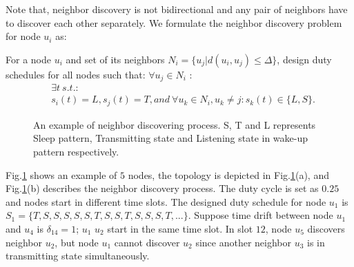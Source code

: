 Note that, neighbor discovery is not bidirectional and any pair of neighbors have to discover each other separately.
We formulate the neighbor discovery problem for node $u_i$ as:
\begin{problem}
For a node $u_i$ and set of its neighbors $N_i = \{u_j | d(u_i, u_j)\leq \Delta \}$, design duty schedules for all nodes such that:
$\forall u_j \in N_i$ :
$$
\begin{aligned}
&\exists t \ s.t. :   \\%
&s_i(t) = L ,
s_{j}(t) = T, and~
\forall u_k \in N_i, u_k \neq j : s_{k}(t) \in \{L, S\}.
\end{aligned}
$$
\end{problem}

\begin{figure}[!h]
\centering
{}
\vspace{0.03in}
\caption{An example of neighbor discovering process. S, T and L represents Sleep pattern,
Transmitting state and Listening state in wake-up pattern respectively.}
\label{NDexample}
\end{figure}

Fig.\ref{NDexample} shows an example of $5$ nodes, the topology is depicted in Fig.\ref{NDexample}(a), and Fig.\ref{NDexample}(b) describes the neighbor discovery process. The duty cycle is set as $0.25$ and nodes start in different time slots.
The designed duty schedule for node $u_1$ is $S_1 = \{ T, S, S, S, S, S, T, S, S, T, S, S, S, T, ... \}$.
Suppose time drift between node $u_1$ and $u_4$ is $\delta_{14} = 1$; $u_1$ $u_2$ start in the same time slot. 
In slot $12$, node $u_5$ discovers neighbor $u_2$, but node $u_1$ cannot discover $u_2$ since another neighbor $u_3$ is in transmitting state simultaneously.

